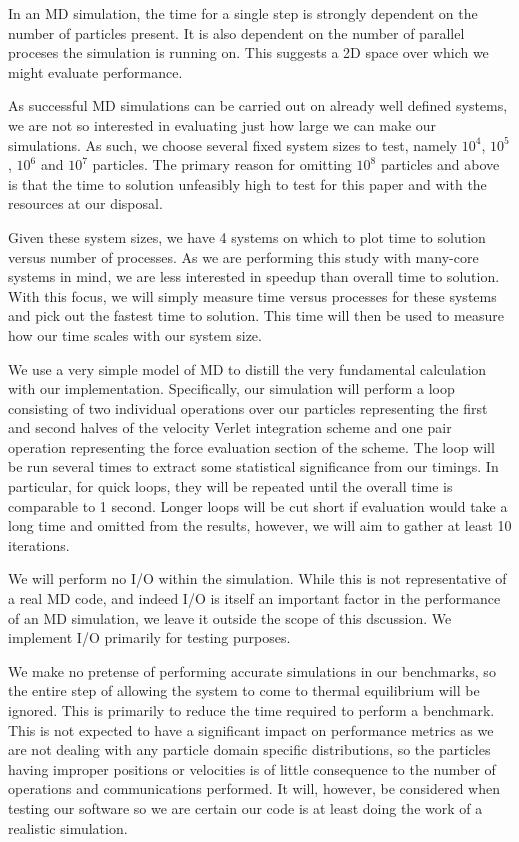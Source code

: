 In an MD simulation, the time for a single step is strongly dependent
on the number of particles present.
%
It is also dependent on the number of parallel proceses the simulation
is running on.
%
This suggests a 2D space over which we might evaluate performance.

As successful MD simulations can be carried out on already well defined
systems, we are not so interested in evaluating just how large we can
make our simulations.
%
As such, we choose several fixed system sizes to test, namely
$10^4$, $10^5$, $10^6$ and $10^7$
particles.
%
The primary reason for omitting $10^8$ particles and above is that the time to
solution unfeasibly high to test for this paper and with the resources
at our disposal.

Given these system sizes, we have 4 systems on which to plot time to solution
versus number of processes.
%
As we are performing this study with many-core systems in mind,
we are less interested in speedup than overall time to solution.
%
With this focus, we will simply measure time versus processes for these
systems and pick out the fastest time to solution.
%
This time will then be used to measure how our time scales with
our system size.

We use a very simple model of MD to distill the very fundamental calculation
with our implementation.
%
Specifically, our simulation will perform a loop consisting of two
individual operations over our particles representing the first
and second halves of the velocity Verlet integration scheme and one
pair operation representing the force evaluation section of the scheme.
%
The loop will be run several times to extract some statistical significance
from our timings.
%
In particular, for quick loops, they will be repeated until the overall
time is comparable to 1 second.
%
Longer loops will be cut short if evaluation would take a long time and omitted
from the results, however, we will aim to gather at least 10 iterations.

We will perform no I/O within the simulation.
%
While this is not representative of a real MD code, and indeed I/O
is itself an important factor in the performance of an MD simulation,
we leave it outside the scope of this dscussion.
%
We implement I/O primarily for testing purposes.

We make no pretense of performing accurate simulations in our benchmarks,
so the entire step of allowing the system to come to
thermal equilibrium will be ignored.
%
This is primarily to reduce the time required to perform a benchmark.
%
This is not expected to have a significant impact on performance metrics
as we are not dealing with any particle domain specific distributions,
so the particles having improper positions or velocities is of
little consequence to the number of operations and communications
performed.
%
It will, however, be considered when testing our software so we are
certain our code is at least doing the work of a realistic simulation.


